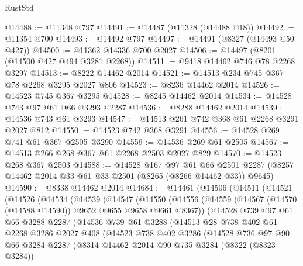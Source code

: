 \begin{lexlean}{RustStd}
\begin{coremodule}
{\begin{coremodule}
{{{{{{{{{{{{{{{{{{{{{{{{{{{{{{{{{{{{{{{{{{{{{{{{{{{{{{@14488 := @11348 @797
@14491 := @14487 (@11328 (@14488 @18))
@14492 := @11354 @700
@14493 := @14492 @797
@14497 := @14491 (@8327 (@14493 @50 @427))
@14500 := @11362 @14336 @700 @2027
@14506 := @14497 (@8201 (@14500 @427 @494 @3281 @2268))
@14511 := @9418 @14462 @746 @78 @2268 @3297
@14513 := @8222 @14462 @2014
@14521 := @14513 @234 @745 @367 @78 @2268 @3295 @2027 @806
@14523 := @8236 @14462 @2014
@14526 := @14523 @745 @367 @3295
@14528 := @8245 @14462 @2014
@14534 := @14528 @743 @97 @61 @66 @3293 @2287
@14536 := @8288 @14462 @2014
@14539 := @14536 @743 @61 @3293
@14547 := @14513 @261 @742 @368 @61 @2268 @3291 @2027 @812
@14550 := @14523 @742 @368 @3291
@14556 := @14528 @269 @741 @61 @367 @2505 @3290
@14559 := @14536 @269 @61 @2505
@14567 := @14513 @266 @268 @367 @61 @2268 @2503 @2027 @829
@14570 := @14523 @268 @367 @2503
@14588 := @14528
    @167
    @97
    @61
    @66
    @2501
    @2287
    (@8257 @14462 @2014 @33 @61 @33 @2501 (@8265 (@8266 @14462 @33)) @9645)
@14590 := @8338 @14462 @2014
@14684 := @14461
    (@14506
      (@14511
        (@14521
          (@14526
            (@14534
              (@14539
                (@14547
                  (@14550
                    (@14556
                      (@14559 (@14567 (@14570 (@14588 @14590)) @9652 @9655 @9658 @9661 @8367))
                      (@14528
                        @739
                        @97
                        @61
                        @66
                        @3288
                        @2287
                        (@14536
                          @739
                          @61
                          @3288
                          (@14513
                            @28
                            @738
                            @402
                            @61
                            @2268
                            @3286
                            @2027
                            @408
                            (@14523
                              @738
                              @402
                              @3286
                              (@14528
                                @736
                                @97
                                @90
                                @66
                                @3284
                                @2287
                                (@8314
                                  @14462
                                  @2014
                                  @90
                                  @735
                                  @3284
                                  (@8322 (@8323 @3284))
}}}}}}}}}}}}}}}}}}}}}}}}}}}}}}}}}}}}}}}}}}}}}}}}}}}}}}
\end{coremodule}}
\end{coremodule}
\end{lexlean}
